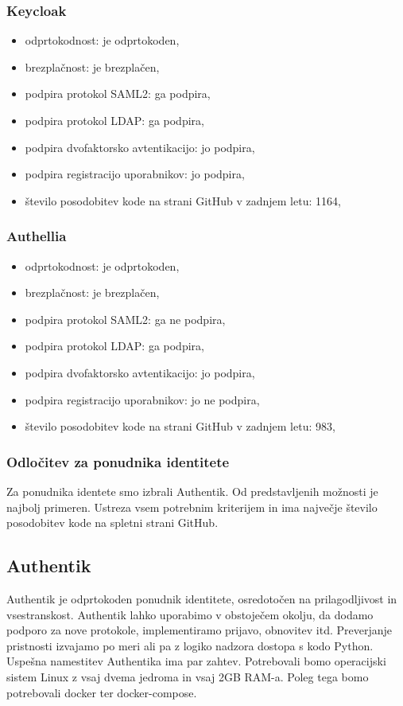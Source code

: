 \documentclass[a4paper,12pt,openright]{book}
\begin{document}
\subsubsection{Keycloak}
\begin{itemize}
    \item odprtokodnost: je odprtokoden,
    \item brezplačnost: je brezplačen,
    \item podpira protokol SAML2: ga podpira,
    \item podpira protokol LDAP: ga podpira,
    \item podpira dvofaktorsko avtentikacijo: jo podpira,
    \item podpira registracijo uporabnikov: jo podpira,
    \item število posodobitev kode na strani GitHub v zadnjem letu: 1164\cite{KeycloakGit},
\end{itemize}
\subsubsection{Authellia}
\begin{itemize}
    \item odprtokodnost: je odprtokoden,
    \item brezplačnost: je brezplačen,
    \item podpira protokol SAML2: ga ne podpira,
    \item podpira protokol LDAP: ga podpira,
    \item podpira dvofaktorsko avtentikacijo: jo podpira,
    \item podpira registracijo uporabnikov: jo ne podpira,
    \item število posodobitev kode na strani GitHub v zadnjem letu: 983\cite{AuthelliaGit},
\end{itemize}
\subsubsection{Odločitev za ponudnika identitete}
Za ponudnika identete smo izbrali Authentik. Od predstavljenih možnosti je najbolj primeren. Ustreza vsem potrebnim kriterijem in ima največje število posodobitev kode na spletni strani GitHub. 
\subsection{Authentik}
Authentik\cite{AuthentikLink} je odprtokoden ponudnik identitete, osredotočen na prilagodljivost in vsestranskost. Authentik lahko uporabimo v obstoječem okolju, da dodamo podporo za nove protokole, implementiramo prijavo, obnovitev itd. Preverjanje pristnosti izvajamo po meri ali pa z logiko nadzora dostopa s kodo Python.
\newline
Uspešna namestitev Authentika ima par zahtev.
Potrebovali bomo operacijski sistem Linux z vsaj dvema jedroma in vsaj 2GB RAM-a. Poleg tega bomo potrebovali docker ter docker-compose. 
\end{document}
